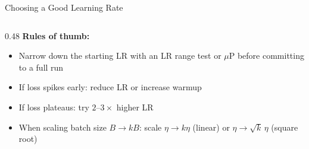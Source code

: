 \begin{frame}{Choosing a Good Learning Rate}
\begin{columns}[T]
\begin{column}{0.48\textwidth}
      \medskip
      \textbf{Rules of thumb:}
      \begin{itemize}
        \item Narrow down the starting LR with an LR range test or $\mu$P before committing to a full run
        \item If loss spikes early: reduce LR or increase warmup
        \item If loss plateaus: try $2\text{--}3\times$ higher LR
        \item When scaling batch size $B \to kB$: scale $\eta \to k\eta$ (linear) or $\eta \to \sqrt{k}\,\eta$ (square root)
      \end{itemize}
    \end{column}
  \end{columns}
\end{frame}

